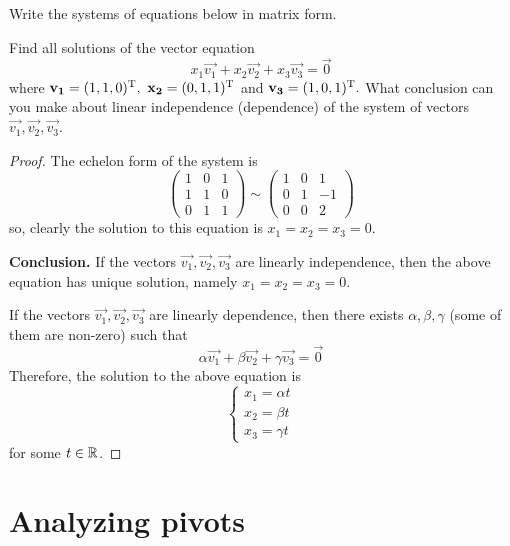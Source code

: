 \documentclass{article}
\begin{document}
\begin{exercise}
  Write the systems of equations below in matrix form.
\end{exercise}
\begin{exercise}
  Find all solutions of the vector equation
  \[x_1\vec{v_1}+x_2\vec{v_2}+x_3\vec{v_3}=\vec{0}\]
  where $\mathbf{v_1}=(1,1,0)^\mathrm{T},~\mathbf{x_2}=(0,1,1)^\mathrm{T}$ and 
  $\mathbf{v_3}=(1,0,1)^\mathrm{T}.$ What conclusion can you make about linear
  independence (dependence) of the system of vectors 
  $\vec{v_1},\vec{v_2},\vec{v_3}$.
\end{exercise}
\begin{proof}
  The echelon form of the system is
  \[
    \begin{pmatrix}
      1 &0 &1\\
      1 &1 &0\\
      0 &1 &1
    \end{pmatrix}
    \sim
    \begin{pmatrix}
      1 &0 &1\\
      0 &1 &-1\\
      0 &0 &2
    \end{pmatrix}
  \]
  so, clearly the solution to this equation is
  $x_1=x_2=x_3=0$.

  \textbf{Conclusion.} If the vectors $\vec{v_1},\vec{v_2},\vec{v_3}$
  are linearly independence, then the above equation has unique 
  solution, namely $x_1=x_2=x_3=0$.

  If the vectors $\vec{v_1},\vec{v_2},\vec{v_3}$ are linearly 
  dependence, then there exists $\alpha, \beta,\gamma$ 
  (some of them are non-zero) such that
  \[\alpha\vec{v_1}+\beta\vec{v_2}+\gamma\vec{v_3}=\vec{0}\]
  Therefore, the solution to the above equation is
  \[
    \begin{cases}
      x_1=\alpha t\\
      x_2=\beta t\\
      x_3=\gamma t
    \end{cases}
  \]
  for some $t\in\R$.
\end{proof}

\section{Analyzing pivots}
\end{document}
